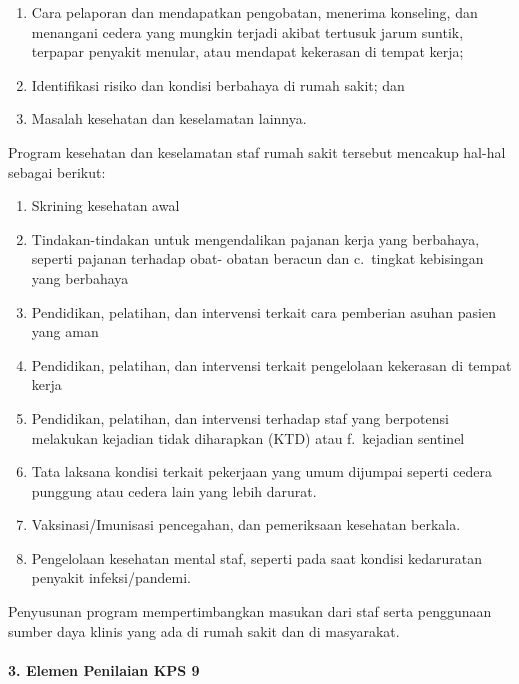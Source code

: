 \documentclass[
]{book}
\providecommand{\tightlist}{%
  \setlength{\itemsep}{0pt}\setlength{\parskip}{0pt}}
\begin{document}
\begin{enumerate}
\def\labelenumi{\alph{enumi}.}
\tightlist
\item
  Cara pelaporan dan mendapatkan pengobatan, menerima konseling, dan menangani cedera yang mungkin terjadi akibat tertusuk jarum suntik, terpapar penyakit menular, atau mendapat kekerasan di tempat kerja;
\item
  Identifikasi risiko dan kondisi berbahaya di rumah sakit; dan
\item
  Masalah kesehatan dan keselamatan lainnya.
\end{enumerate}

Program kesehatan dan keselamatan staf rumah sakit tersebut mencakup hal-hal sebagai berikut:

\begin{enumerate}
\def\labelenumi{\alph{enumi}.}
\tightlist
\item
  Skrining kesehatan awal
\item
  Tindakan-tindakan untuk mengendalikan pajanan kerja yang berbahaya, seperti pajanan terhadap obat- obatan beracun dan c.~tingkat kebisingan yang berbahaya
\item
  Pendidikan, pelatihan, dan intervensi terkait cara pemberian asuhan pasien yang aman
\item
  Pendidikan, pelatihan, dan intervensi terkait pengelolaan kekerasan di tempat kerja
\item
  Pendidikan, pelatihan, dan intervensi terhadap staf yang berpotensi melakukan kejadian tidak diharapkan (KTD) atau f.~kejadian sentinel
\item
  Tata laksana kondisi terkait pekerjaan yang umum dijumpai seperti cedera punggung atau cedera lain yang lebih darurat.
\item
  Vaksinasi/Imunisasi pencegahan, dan pemeriksaan kesehatan berkala.
\item
  Pengelolaan kesehatan mental staf, seperti pada saat kondisi kedaruratan penyakit infeksi/pandemi.
\end{enumerate}

Penyusunan program mempertimbangkan masukan dari staf serta penggunaan sumber daya klinis yang ada di rumah sakit dan di masyarakat.

\hypertarget{elemen-penilaian-kps-9}{%
\paragraph*{3. Elemen Penilaian KPS 9}\label{elemen-penilaian-kps-9}}
\end{document}
